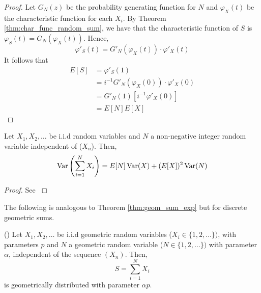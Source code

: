 \begin{proof}
Let $G_N(z)$  be the probability generating function for $N$ and $\varphi_X(t)$ be the characteristic function for each $X_i$.
By Theorem \ref{thm:char_func_random_sum}, we have that the characteristic function of $S$ is $\varphi_S(t) = G_N(\varphi_X(t))$.
Hence,
$$
\varphi'_S(t) = G'_N(\varphi_X(t)) \cdot \varphi'_X(t)
$$
It follows that
\begin{align*}
    E[S] &= \varphi'_S(1)\\
    &= i^{-1} G'_N(\varphi_X(0)) \cdot \varphi'_X(0)\\
    &= G'_N(1) [i^{-1} \varphi'_X(0)]   \\
    &= E[N] E[X]
\end{align*}

\end{proof}

\begin{theorem} \label{thm:random_sum_var}
Let $X_1, X_2, \ldots$ be i.i.d random variables and $N$ a non-negative integer random variable independent of ($X_n$).
Then,
$$
\operatorname {Var}\left( \sum_{i = 1}^N X_i \right) = E[N]\operatorname {Var}(X) + (E[X])^2 \operatorname {Var}(N)
$$
\end{theorem}

\begin{proof}
See \cite{Ross97}
\end{proof}

The following is analogous to Theorem \ref{thm:geom_sum_exp} but for discrete geometric sums.

\begin{theorem}\label{thm:geom_sum_geom} (\cite{Nelson1995})
Let $X_1, X_2, \ldots$ be i.i.d geometric random variables ($X_i \in \{1,2,\ldots\})$, with parameters $p$ and $N$ a geometric random variable ($N \in \{1,2,\ldots\})$ with parameter $\alpha$, independent of the sequence $(X_n)$.
Then,
$$
S = \sum_{i = 1}^N X_i
$$
is geometrically distributed with parameter $\alpha p$.
\end{theorem}


